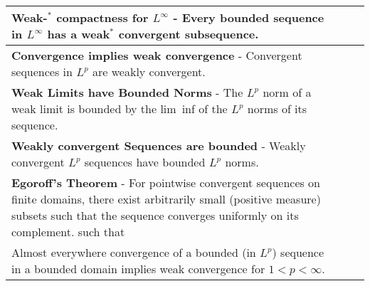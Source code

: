 \begin{longtable}{|*{3}{>{\centering\arraybackslash}p{}|}}
            \textbf{Weak-$^*$ compactness for $L^\infty$} - Every bounded sequence in $L^\infty$ has a weak$^*$ convergent subsequence.
            &
            
            \\[6pt] \hline
            
            \textbf{Convergence implies weak convergence} - Convergent sequences in $L^p$ are weakly convergent.
            &
            
            \\[6pt] \hline
            
            \textbf{Weak Limits have Bounded Norms} - The $L^p$ norm of a weak limit is bounded by the lim~inf of the $L^p$ norms of its sequence.
            &
            
            \\[6pt] \hline
            
            \textbf{Weakly convergent Sequences are bounded} - Weakly convergent $L^p$ sequences have bounded $L^p$ norms.
            &
            
            \\[6pt] \hline
            
            \textbf{Egoroff's Theorem} - For pointwise convergent sequences on finite domains, there exist arbitrarily small (positive measure) subsets such that the sequence converges uniformly on its complement. \newline {$\!\begin{gathered}\forall \E < 0,\ \exists E \subset \Omega\ \text{with}\ \abs{E} < \E\end{gathered}$} \newline such that \newline {$\!\begin{gathered} f_k \rightarrow f\ \text{uniformly on}\ \Omega\setminus E \end{gathered}$}
            &
            
            \\[6pt] \hline
            
            Almost everywhere convergence of a bounded (in $L^p$) sequence in a bounded domain implies weak convergence for $1 < p < \infty$. \newline {$\!\begin{gathered}\left\{\begin{array}{l} \Omega \subset \Rl^n\ \text{bounded}, \\ \sup_{k}\norm{f_k}_p \leq M < \infty, \text{and} \\ f_k \rightarrow f\ \text{ a.e.} \end{array}\right\} \implies f_k \rightharpoonup f \end{gathered}$}
            &
            

\end{longtable}
